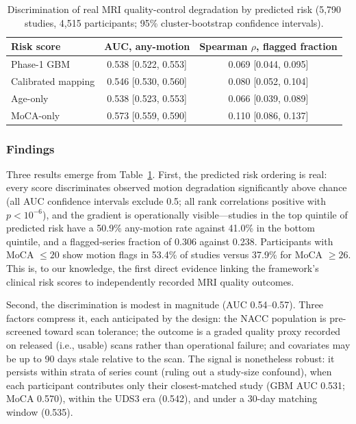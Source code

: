 \documentclass[11pt,a4paper]{article}
\begin{document}
{\begin{table}[H]
\centering
\color{red}
\caption{Discrimination of real MRI quality-control degradation by predicted risk (5{,}790 studies, 4{,}515 participants; 95\% cluster-bootstrap confidence intervals).}
\label{tab:qc_validation}
\begin{tabular}{@{}lcc@{}}
\toprule
\textbf{Risk score} & \textbf{AUC, any-motion} & \textbf{Spearman $\rho$, flagged fraction} \\
\midrule
Phase-1 GBM & 0.538 [0.522, 0.553] & 0.069 [0.044, 0.095] \\
Calibrated mapping & 0.546 [0.530, 0.560] & 0.080 [0.052, 0.104] \\
Age-only & 0.538 [0.523, 0.553] & 0.066 [0.039, 0.089] \\
MoCA-only & 0.573 [0.559, 0.590] & 0.110 [0.086, 0.137] \\
\bottomrule
\end{tabular}
\end{table}

\subsubsection{Findings}

Three results emerge from Table~\ref{tab:qc_validation}. First, the predicted risk ordering is real: every score discriminates observed motion degradation significantly above chance (all AUC confidence intervals exclude 0.5; all rank correlations positive with $p < 10^{-6}$), and the gradient is operationally visible---studies in the top quintile of predicted risk have a 50.9\% any-motion rate against 41.0\% in the bottom quintile, and a flagged-series fraction of 0.306 against 0.238. Participants with MoCA $\leq 20$ show motion flags in 53.4\% of studies versus 37.9\% for MoCA $\geq 26$. This is, to our knowledge, the first direct evidence linking the framework's clinical risk scores to independently recorded MRI quality outcomes.

Second, the discrimination is modest in magnitude (AUC 0.54--0.57). Three factors compress it, each anticipated by the design: the NACC population is pre-screened toward scan tolerance; the outcome is a graded quality proxy recorded on released (i.e., usable) scans rather than operational failure; and covariates may be up to 90 days stale relative to the scan. The signal is nonetheless robust: it persists within strata of series count (ruling out a study-size confound), when each participant contributes only their closest-matched study (GBM AUC 0.531; MoCA 0.570), within the UDS3 era (0.542), and under a 30-day matching window (0.535).

}
\end{document}
